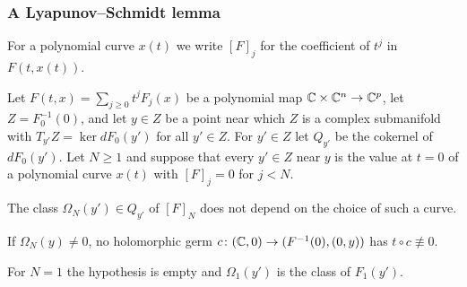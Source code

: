 \subsubsection{A Lyapunov--Schmidt lemma}\label{d4-ls}
For a polynomial curve $x(t)$ we write $[F]_j$ for the coefficient of $t^j$ in $F(t,x(t))$.

\begin{lemma}\label{lem:d4-ls}
Let $F(t,x)=\sum_{j\ge0}t^jF_j(x)$ be a polynomial map $\mathbb{C}\times\mathbb{C}^n\to\mathbb{C}^p$, let
$Z=F_0^{-1}(0)$, and let $y\in Z$ be a point near which $Z$ is a complex submanifold with
$T_{y'}Z=\ker dF_0(y')$ for all $y'\in Z$.  For $y'\in Z$ let $Q_{y'}$ be the cokernel of
$dF_0(y')$.  Let $N\ge1$ and suppose that every $y'\in Z$ near $y$ is the value at $t=0$ of a
polynomial curve $x(t)$ with $[F]_j=0$ for $j<N$.
\begin{alphalist}
  \item The class $\Omega_N(y')\in Q_{y'}$ of $[F]_N$ does not depend on the choice of such a curve.
  \item If $\Omega_N(y)\ne0$, no holomorphic germ $c\colon(\mathbb{C},0)\to(F^{-1}(0),(0,y))$ has
  $t\circ c\not\equiv0$.
\end{alphalist}
For $N=1$ the hypothesis is empty and $\Omega_1(y')$ is the class of $F_1(y')$.
\end{lemma}

